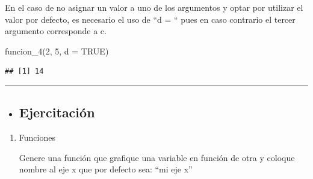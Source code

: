\documentclass[
]{book}
\newenvironment{Shaded}{\begin{snugshade}}{\end{snugshade}}
\newcommand{\AttributeTok}[1]{\textcolor[rgb]{0.77,0.63,0.00}{#1}}
\newcommand{\ConstantTok}[1]{\textcolor[rgb]{0.00,0.00,0.00}{#1}}
\newcommand{\DecValTok}[1]{\textcolor[rgb]{0.00,0.00,0.81}{#1}}
\newcommand{\FunctionTok}[1]{\textcolor[rgb]{0.00,0.00,0.00}{#1}}
\newcommand{\NormalTok}[1]{#1}
\newenvironment{rmdblock}[1]
{\begin{shaded*}
		\begin{itemize}
			\renewcommand{\labelitemi}{
				\raisebox{-.7\height}[0pt][0pt]{
					{\setkeys{Gin}{width=3em,keepaspectratio}\texttt{[image: images/\#1]}}
				}
			}
			\item
		}
		{
		\end{itemize}
	\end{shaded*}
}
\newenvironment{rmdtip}
{\begin{rmdblock}{tip}}
	{\end{rmdblock}}
\begin{document}
En el caso de no asignar un valor a uno de los argumentos y optar por utilizar
el valor por defecto, es necesario el uso de ``d = `` pues en caso contrario el
tercer argumento corresponde a c.

\begin{Shaded}
\begin{Highlighting}[]
\FunctionTok{funcion\_4}\NormalTok{(}\DecValTok{2}\NormalTok{, }\DecValTok{5}\NormalTok{, }\AttributeTok{d =} \ConstantTok{TRUE}\NormalTok{) }
\end{Highlighting}
\end{Shaded}

\begin{verbatim}
## [1] 14
\end{verbatim}

\begin{center}\rule{0.5\linewidth}{0.5pt}\end{center}

\begin{rmdtip}
\hypertarget{ejercitaciuxf3n}{%
\subsection{Ejercitación}\label{ejercitaciuxf3n}}
\end{rmdtip}

\begin{enumerate}
\def\labelenumi{\arabic{enumi}.}
\item
  Funciones

  Genere una función que grafique una variable en función de otra y coloque
  nombre al eje x que por defecto sea: ``mi eje x''
\end{enumerate}

  
\end{document}
